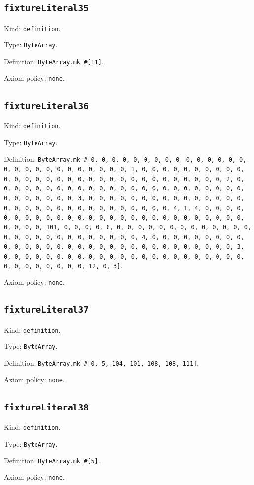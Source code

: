 \documentclass[11pt]{article}
\begin{document}
\subsection*{\texttt{fixtureLiteral35}}
\noindent Kind: \texttt{definition}.\par
\noindent Type: \texttt{ByteArray}.\par
\noindent Definition: \texttt{ByteArray.mk \#[11]}.\par
\noindent Axiom policy: \texttt{none}.\par
\subsection*{\texttt{fixtureLiteral36}}
\noindent Kind: \texttt{definition}.\par
\noindent Type: \texttt{ByteArray}.\par
\noindent Definition: \texttt{ByteArray.mk \#[0, 0, 0, 0, 0, 0, 0, 0, 0, 0, 0, 0, 0, 0, 0, 0, 0, 0, 0, 0, 0, 0, 0, 0, 0, 0, 0, 1, 0, 0, 0, 0, 0, 0, 0, 0, 0, 0, 0, 0, 0, 0, 0, 0, 0, 0, 0, 0, 0, 0, 0, 0, 0, 0, 0, 0, 0, 0, 0, 2, 0, 0, 0, 0, 0, 0, 0, 0, 0, 0, 0, 0, 0, 0, 0, 0, 0, 0, 0, 0, 0, 0, 0, 0, 0, 0, 0, 0, 0, 0, 0, 3, 0, 0, 0, 0, 0, 0, 0, 0, 0, 0, 0, 0, 0, 0, 0, 0, 0, 0, 0, 0, 0, 0, 0, 0, 0, 0, 0, 0, 0, 0, 0, 4, 1, 4, 0, 0, 0, 0, 0, 0, 0, 0, 0, 0, 0, 0, 0, 0, 0, 0, 0, 0, 0, 0, 0, 0, 0, 0, 0, 0, 0, 0, 0, 0, 0, 101, 0, 0, 0, 0, 0, 0, 0, 0, 0, 0, 0, 0, 0, 0, 0, 0, 0, 0, 0, 0, 0, 0, 0, 0, 0, 0, 0, 0, 0, 0, 0, 4, 0, 0, 0, 0, 0, 0, 0, 0, 0, 0, 0, 0, 0, 0, 0, 0, 0, 0, 0, 0, 0, 0, 0, 0, 0, 0, 0, 0, 0, 0, 0, 3, 0, 0, 0, 0, 0, 0, 0, 0, 0, 0, 0, 0, 0, 0, 0, 0, 0, 0, 0, 0, 0, 0, 0, 0, 0, 0, 0, 0, 0, 0, 0, 12, 0, 3]}.\par
\noindent Axiom policy: \texttt{none}.\par
\subsection*{\texttt{fixtureLiteral37}}
\noindent Kind: \texttt{definition}.\par
\noindent Type: \texttt{ByteArray}.\par
\noindent Definition: \texttt{ByteArray.mk \#[0, 5, 104, 101, 108, 108, 111]}.\par
\noindent Axiom policy: \texttt{none}.\par
\subsection*{\texttt{fixtureLiteral38}}
\noindent Kind: \texttt{definition}.\par
\noindent Type: \texttt{ByteArray}.\par
\noindent Definition: \texttt{ByteArray.mk \#[5]}.\par
\noindent Axiom policy: \texttt{none}.\par
\end{document}
